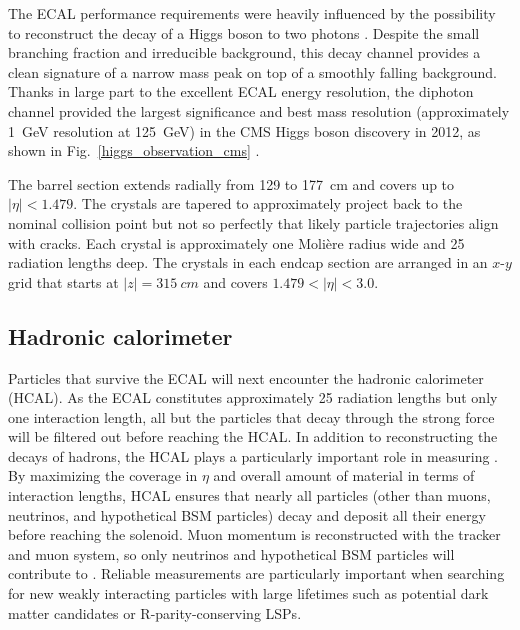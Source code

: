 The ECAL performance requirements were heavily influenced by the possibility to reconstruct the decay of a Higgs boson to two photons \cite{cms_tdr_v2}. Despite the small branching fraction and irreducible background, this decay channel provides a clean signature of a narrow mass peak on top of a smoothly falling background. Thanks in large part to the excellent ECAL energy resolution, the diphoton channel provided the largest significance and best mass resolution (approximately \SI{1}{\GeV} resolution at \SI{125}{\GeV}) in the CMS Higgs boson discovery in 2012, as shown in Fig.~\ref{higgs_observation_cms} \cite{cms_higgs}.



The barrel section extends radially from \num{129} to \SI{177}{cm} and covers up to $|\eta|<1.479$. The crystals are tapered to approximately project back to the nominal collision point but not so perfectly that likely particle trajectories align with cracks. Each crystal is approximately one Moli\`ere radius wide and 25 radiation lengths deep. The crystals in each endcap section are arranged in an $x$-$y$ grid that starts at $|z|=\SI{315}{cm}$ and covers $1.479<|\eta|<3.0$.


\subsection{Hadronic calorimeter}
Particles that survive the ECAL will next encounter the hadronic calorimeter (HCAL). As the ECAL constitutes approximately 25 radiation lengths but only one interaction length, all but the particles that decay through the strong force will be filtered out before reaching the HCAL. In addition to reconstructing the decays of hadrons, the HCAL plays a particularly important role in measuring \ptmiss. By maximizing the coverage in $\eta$ and overall amount of material in terms of interaction lengths, HCAL ensures that nearly all particles (other than muons, neutrinos, and hypothetical BSM particles) decay and deposit all their energy before reaching the solenoid. Muon momentum is reconstructed with the tracker and muon system, so only neutrinos and hypothetical BSM particles will contribute to \ptmiss. Reliable \ptmiss measurements are particularly important when searching for new weakly interacting particles with large lifetimes such as potential dark matter candidates or R-parity-conserving LSPs.

